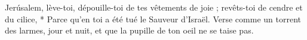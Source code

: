 Jerúsalem, lève-toi, dépouille-toi de tes vêtements de joie ; revêts-toi de cendre et du cilice,
* Parce qu'en toi a été tué le Sauveur d'Israël.
\versseparator
Verse comme un torrent des larmes, jour et nuit, et que la pupille de ton oeil ne se taise pas.